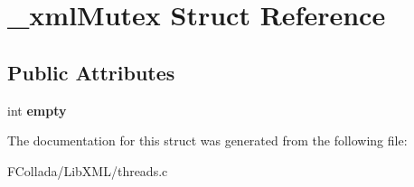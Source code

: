 \hypertarget{struct__xmlMutex}{
\section{\_\-xmlMutex Struct Reference}
\label{struct__xmlMutex}
}
\subsection*{Public Attributes}
\begin{DoxyCompactItemize}
\item 
\hypertarget{struct__xmlMutex_a1a3703230e83d191cc55ae3c7dd108a9}{
int {\bfseries empty}}
\label{struct__xmlMutex_a1a3703230e83d191cc55ae3c7dd108a9}

\end{DoxyCompactItemize}


The documentation for this struct was generated from the following file:\begin{DoxyCompactItemize}
\item 
FCollada/LibXML/threads.c\end{DoxyCompactItemize}
